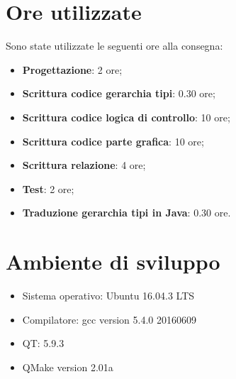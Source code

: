 \documentclass[a4paper,10pt]{article}
\begin{document}
            \section{Ore utilizzate}
            Sono state utilizzate le seguenti ore alla consegna:
            \begin{itemize}
                \item \textbf{Progettazione}: 2 ore;
                \item \textbf{Scrittura codice gerarchia tipi}: 0.30 ore;
                \item \textbf{Scrittura codice logica di controllo}: 10 ore;
                \item \textbf{Scrittura codice parte grafica}: 10 ore;
                \item \textbf{Scrittura relazione}: 4 ore;
                \item \textbf{Test}: 2 ore;
                \item \textbf{Traduzione gerarchia tipi in Java}: 0.30 ore.
    
            \end{itemize}
            \section{Ambiente di sviluppo}
            \begin{itemize}
                \item Sistema operativo: Ubuntu 16.04.3 LTS
                \item Compilatore: gcc version 5.4.0 20160609
                \item QT: 5.9.3
                \item QMake version 2.01a
            \end{itemize}
    
\end{document}

